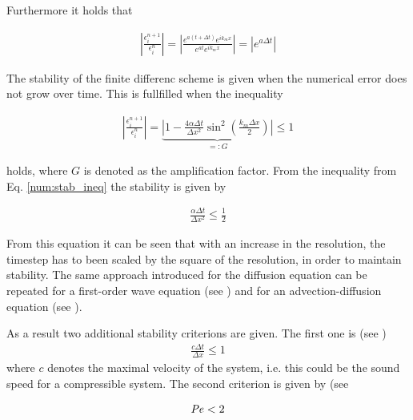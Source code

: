 Furthermore it holds that

\begin{align}
    \left|\frac{\epsilon_i^{n+1}}{\epsilon_i^n}\right| =
    \left|\frac{e^{a(t + \Delta t)}e^{ik_mx}}{ e^{at}e^{ik_m x}}\right| = \left|e^{a\Delta t}\right|
\end{align}

The stability of the finite differenc scheme is given when the numerical error does not grow over time. This is fullfilled when the inequality

\begin{align}
    \label{num:stab_ineq}
    \left|\frac{\epsilon_i^{n+1}}{\epsilon_i^n}\right| =
    \underbrace{\left|1 -  \frac{4\alpha \Delta t}{\Delta x^2} \sin^2\left(\frac{k_m \Delta x}{2}\right)\right|}_{=:G} \leq 1
\end{align}

holds, where $G$ is denoted as the amplification factor. From the inequality from Eq. \ref{num:stab_ineq}
the stability is given by

\begin{align}
   \frac{\alpha \Delta t}{\Delta x^2} \leq \frac{1}{2}
\end{align}

From this equation it can be seen that with an increase in the resolution, the timestep has to been scaled by the square of the resolution, in order to
maintain stability. The same approach introduced for the diffusion equation can be repeated for a first-order wave equation (see \citep{janderson})
and for an advection-diffusion equation (see \citep{ferziger99}).

As a result two additional stability criterions are given.
The first one is (see \citep{janderson})
\begin{align}
    \label{num:stab_soundspeed}
   \frac{c \Delta t}{\Delta x} \leq 1
\end{align}
where $c$ denotes the maximal velocity of the system, i.e. this could be the sound speed for a compressible system.
The second criterion is given by (see \citep{ferziger99}

\begin{align}
    \mbox{\textit{Pe}}  < 2
\end{align}

